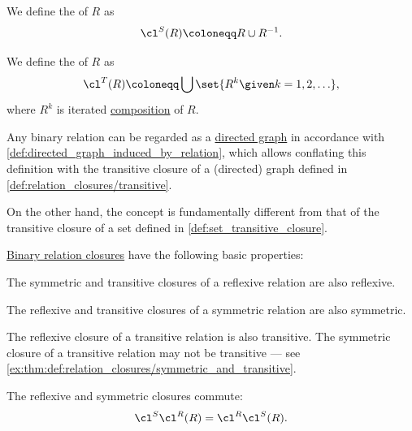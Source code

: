 \begin{comments}
\begin{definition}
\begin{thmenum}
     We define the  of \( R \) as
    \begin{equation*}
      \cl^S(R) \coloneqq R \cup R^{-1}.
    \end{equation*}

     We define the  of \( R \) as
    \begin{equation*}
      \cl^T(R) \coloneqq \bigcup \set{ R^k \given k = 1, 2, \ldots },
    \end{equation*}
    where \( R^k \) is iterated \hyperref[def:binary_relation/composition]{composition} of \( R \).
  \end{thmenum}
\end{definition}
\begin{comments}
  \item Any binary relation can be regarded as a \hyperref[def:directed_graph]{directed graph} in accordance with \cref{def:directed_graph_induced_by_relation}, which allows conflating this definition with the transitive closure of a (directed) graph defined in \cref{def:relation_closures/transitive}.

  On the other hand, the concept is fundamentally different from that of the transitive closure of a set defined in \cref{def:set_transitive_closure}.
\end{comments}

\begin{proposition}\label{thm:def:relation_closures}
  \hyperref[def:relation_closures]{Binary relation closures} have the following basic properties:
  \begin{thmenum}
     The symmetric and transitive closures of a reflexive relation are also reflexive.

     The reflexive and transitive closures of a symmetric relation are also symmetric.

     The reflexive closure of a transitive relation is also transitive. The symmetric closure of a transitive relation may not be transitive --- see \cref{ex:thm:def:relation_closures/symmetric_and_transitive}.

     The reflexive and symmetric closures commute:
    \begin{equation}\label{eq:thm:def:relation_closures/reflexive_and_symmetric}
      \cl^S \cl^R(R) = \cl^R \cl^S(R).
    \end{equation}


\end{thmenum}
\end{proposition}
\end{comments}
